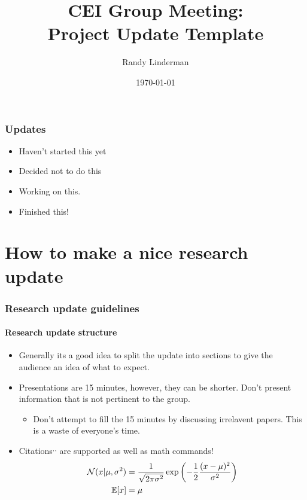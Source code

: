 \documentclass[aspectratio=1610]{beamer}
\title[Research Update]{CEI Group Meeting:\\Project Update Template}
\author{Randy Linderman}
\institute[Duke]{Electrical and Computer Engineering\\Duke University}
\date{\today}
\begin{document}
\begin{frame}
  \titlepage
\end{frame}

\begin{frame}[t]
  \frametitle{Updates}
  \begin{itemize}
    \item[\notstarted] Haven't started this yet
    \item[\wontfix] Decided not to do this
    \item[\inprogress] Working on this.
    \item[\done] Finished this!
  \end{itemize}
\end{frame}

\section{How to make a nice research update}
\begin{frame}[t]
  \frametitle{Research update guidelines}
  \framesubtitle{Research update structure}
  \begin{itemize}
    \item Generally its a good idea to split the update into sections to give
      the audience an idea of what to expect.
    \item Presentations are 15 minutes, however, they can be shorter. Don't
      present information that is not pertinent to the group.
    \begin{itemize}
      \item Don't attempt to fill the 15 minutes by discussing irrelavent
        papers. This is a waste of everyone's time.
    \end{itemize}
    \item Citations$^,$$^,$
      are supported as well as math commands!
      \begin{align*}
        \mathcal{N}(x|\mu, \sigma^2) &= \frac{1}{\sqrt{2\pi\sigma^2}}\exp\left(-\frac{1}{2}\frac{(x-\mu)^2}{\sigma^2}\right) \\
        \mathbb{E}[x] &= \mu
      \end{align*}
  \end{itemize}
\end{frame}
\end{document}
